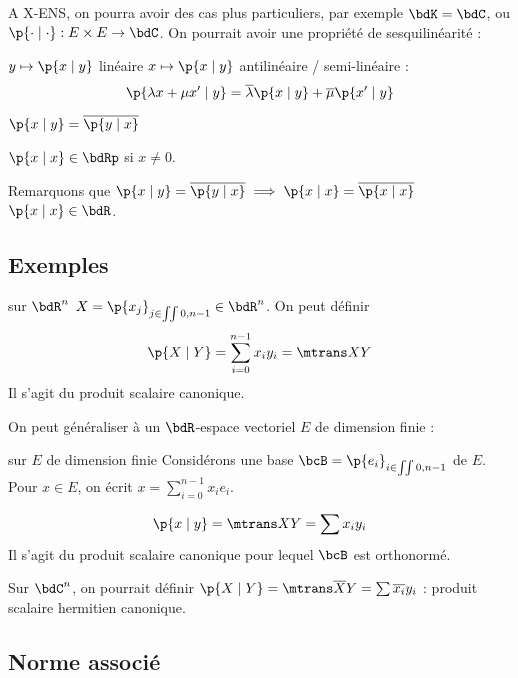 \documentclass[a4paper,french,bookmarks]{book}
\begin{document}
    A X-ENS, on pourra avoir des cas plus particuliers, par exemple $\bdK = \bdC$, ou $\p{\cdot \mid \cdot } : E \times E \to \bdC$. On pourrait avoir une propriété de sesquilinéarité :
    \begin{enumerate}
        \itt $y \mapsto \p{x \mid y}$ linéaire
        \itt $x \mapsto \p{x \mid y}$ antilinéaire / semi-linéaire :
        \[ \p{\lambda x + \mu x' \mid y} = \overline \lambda \p{x \mid y} + \overline{\mu}\p{x' \mid y}\]
        
        \itt $\p{x \mid y} = \overline{\p{y \mid x}}$
        
        \itt $\p{x \mid x} \in \bdRp$ si $x \neq 0$.
    \end{enumerate}
    
    Remarquons que $\p{x \mid y} = \overline{\p{y \mid x}} \implies \p{x \mid x} = \overline{\p{x \mid x}}$ \ie $\p{x \mid x} \in \bdR$.
    
    \subsection{Exemples}
    
    \begin{example}{sur $\bdR^n$}{}
        $X = \p{x_j}_{j \in \iint{0, n-1}}\in \bdR^n$. On peut définir
        \[ \p{X \mid Y} = \sum_{i=0}^{n-1} x_iy_i = \mtrans XY\]
        Il s'agit du produit scalaire canonique.
    \end{example}
    
    On peut généraliser à un $\bdR$-espace vectoriel $E$ de dimension finie :
    
    \begin{example}{sur $E$ de dimension finie}{}
        Considérons une base $\bcB = \p{e_i}_{i \in \iint{0, n-1}}$ de $E$. Pour $x \in E$, on écrit $x = \sum_{i=0}^{n-1} x_ie_i$.
        
        \[ \p{x \mid y} = \mtrans X Y = \sum x_iy_i\]
        Il s'agit du produit scalaire canonique pour lequel $\bcB$ est orthonormé.
    \end{example}
    
    Sur $\bdC^n$, on pourrait définir $\p{X \mid Y} = \mtrans \overline{X} Y = \sum \overline{x_i}y_i$ : produit scalaire hermitien canonique.
    
    
    
    \subsection{Norme associé}
    
\end{document}
